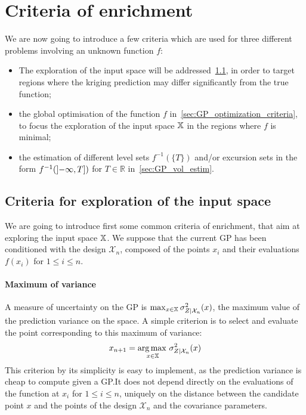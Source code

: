 \documentclass[../../Main_ManuscritThese.tex]{subfiles}
\begin{document}
\section{Criteria of enrichment}

We are now going to introduce a few criteria which are used for three
different problems involving an unknown function $f$:
\begin{itemize}
\item The exploration of the input space will be
  addressed~\cref{sec:exploration_criteria}, in order to target
  regions where the kriging prediction may differ significantly from
  the true function;
\item the global optimisation of the function $f$
  in~\cref{sec:GP_optimization_criteria}, to focus the exploration of
  the input space $\mathbb{X}$ in the regions where $f$ is minimal;
\item the estimation of different level sets $f^{-1}(\{T\})$ and/or
  excursion sets in the form
  $f^{-1}(\interval[open left]{-\infty}{T})$ for $T\in\mathbb{R}$
  in~\cref{sec:GP_vol_estim}.
\end{itemize}

\subsection{Criteria for exploration of the input space}
\label{sec:exploration_criteria}
We are going to introduce first some common criteria of enrichment,
that aim at exploring the input space $\mathbb{X}$.  We suppose that the
current GP has been conditioned with the design $\mathcal{X}_n$,
composed of the points $x_i$ and their evaluations $f(x_i)$ for
$1\leq i \leq n$.

\paragraph{Maximum of variance}
A measure of uncertainty on the GP is
$\max_{x\in\mathbb{X}} \sigma_{Z \mid \mathcal{X}_n}^2(x)$, the maximum
value of the prediction variance on the space. A simple criterion is
to select and evaluate the point corresponding to this maximum of
variance:
\begin{equation}
  x_{n+1} = \operatorname*{arg\,max \,}_{x \in \mathbb{X}} \sigma^2_{Z \mid \mathcal{X}_n}(x)
\end{equation}
This criterion by its simplicity is easy to implement, as the
prediction variance is cheap to compute given a GP.\@ It does not
depend directly on the evaluations of the function at $x_i$ for
$1\leq i\leq n$, uniquely on the distance between the candidate point
$x$ and the points of the design $\mathcal{X}_n$ and the covariance
parameters.
\end{document}
